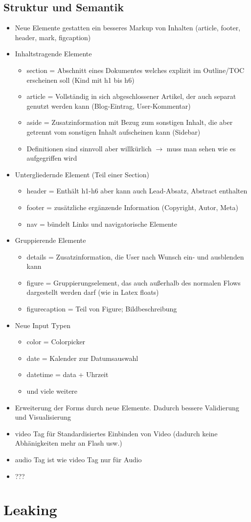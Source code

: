 \documentclass{article} %
\begin{document}
	\subsection{Struktur und Semantik}
	\begin{itemize}
		\item Neue Elemente gestatten ein besseres Markup von Inhalten (article, footer, header, mark, figcaption)
		\item Inhaltstragende Elemente
		\begin{itemize}
			\item section = Abschnitt eines Dokumentes welches explizit im Outline/TOC erscheinen soll (Kind mit h1 bis h6)
			\item article = Vollständig in sich abgeschlossener Artikel, der auch separat genutzt werden kann (Blog-Eintrag, User-Kommentar)
			\item aside = Zusatzinformation mit Bezug zum sonstigen Inhalt, die aber getrennt vom sonstigen Inhalt aufscheinen kann (Sidebar)
			\item Definitionen sind sinnvoll aber willkürlich $\rightarrow$ muss man sehen wie es aufgegriffen wird
		\end{itemize}
		\item Untergliedernde Element (Teil einer Section)
		\begin{itemize}
			\item header = Enthält h1-h6 aber kann auch Lead-Absatz, Abstract enthalten
			\item footer = zusätzliche ergänzende Information (Copyright, Autor, Meta)
			\item nav = bündelt Links und navigatorische Elemente
		\end{itemize}
		\item Gruppierende Elemente
		\begin{itemize}
			\item details = Zusatzinformation, die User nach Wunsch ein‐ und ausblenden kann
			\item figure = Gruppierungselement, das auch außerhalb des normalen Flows dargestellt werden darf (wie in Latex floats)
			\item figurecaption = Teil von Figure; Bildbeschreibung
		\end{itemize}
		\item Neue Input Typen
		\begin{itemize}
			\item color = Colorpicker
			\item date = Kalender zur Datumsauswahl
			\item datetime = data + Uhrzeit
			\item und viele weitere
		\end{itemize}
		\item Erweiterung der Forms durch neue Elemente. Dadurch bessere Validierung und Visualisierung
		\item video Tag für Standardisiertes Einbinden von Video (dadurch keine Abhänigkeiten mehr an Flash usw.)
		\item audio Tag ist wie video Tag nur für Audio
		\item ???
	\end{itemize}
\section{Leaking}
\end{document}
